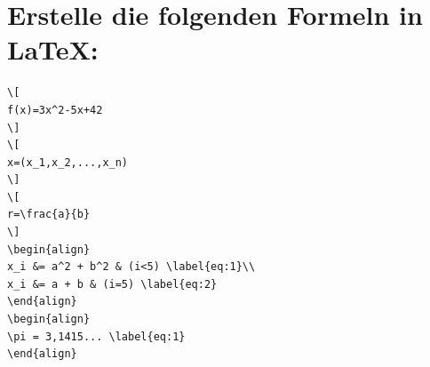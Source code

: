 
\usepackage{multirow}
\usepackage{colortbl}		%

\newcommand{\abstandVorResult}{-15pt}
\newcommand{\abstandVorListing}{-10pt}
\newcommand{\abstandNachListing}{-30pt}


\section{Erstelle die folgenden Formeln in \LaTeX:}\label{AG:1}

\begin{Antwort}
\begin{lstlisting}[style=latex]
\[
f(x)=3x^2-5x+42
\]
\[
x=(x_1,x_2,...,x_n)
\]
\[
r=\frac{a}{b}
\]
\begin{align}
x_i &= a^2 + b^2 & (i<5) \label{eq:1}\\
x_i &= a + b & (i=5) \label{eq:2}
\end{align}
\begin{align}
\pi = 3,1415... \label{eq:1}
\end{align}
\end{lstlisting}
\end{Antwort}
\newpage

